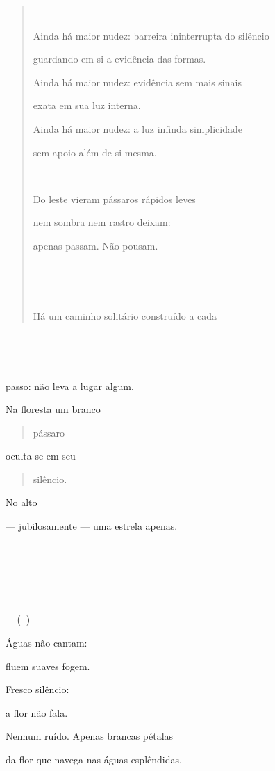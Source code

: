 \begin{quote}


Ainda há maior nudez: barreira ininterrupta do silêncio

guardando em si a evidência das formas.

Ainda há maior nudez: evidência sem mais sinais

exata em sua luz interna.

Ainda há maior nudez: a luz infinda simplicidade

sem apoio além de si mesma.



Do leste vieram pássaros rápidos leves

nem sombra nem rastro deixam:

apenas passam. Não pousam.





Há um caminho solitário construído a cada
\end{quote}





passo: não leva a lugar algum.

Na floresta um branco

\begin{quote}
pássaro
\end{quote}

oculta-se em seu

\begin{quote}
silêncio.
\end{quote}

No alto

--- jubilosamente --- uma estrela apenas.







 ()

Águas não cantam:

fluem suaves fogem.

Fresco silêncio:

a flor não fala.

Nenhum ruído. Apenas brancas pétalas

da flor que navega nas águas esplêndidas.

